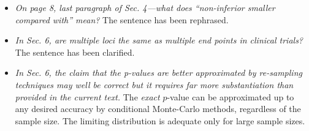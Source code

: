 \documentclass{article}
\begin{document}
\begin{itemize}
\item
\textit{
On page 8, last paragraph of Sec. 4—what does “non-inferior smaller compared with”
mean?}
The sentence has been rephrased.

\item
\textit{
In Sec. 6, are multiple loci the same as multiple end points in clinical trials?
}
The sentence has been clarified.

\item
\textit{
In Sec. 6, the claim that the p-values are better approximated by re-sampling techniques
may well be correct but it requires far more substantiation than provided in the current
text.
}
The \emph{exact} $p$-value can be approximated up to any desired accuracy
by conditional Monte-Carlo methods, regardless of the sample size. 
The limiting distribution is adequate only for large sample sizes.

\end{itemize}



\end{document}
